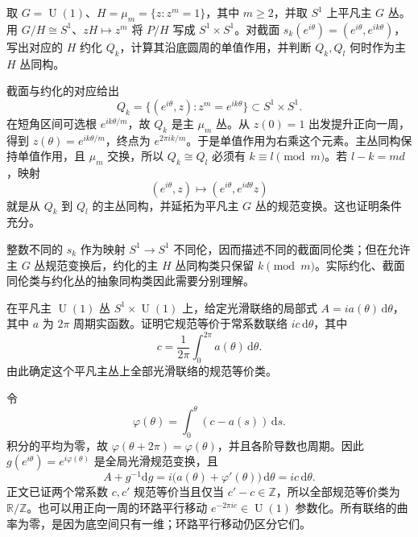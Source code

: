 \begin{exercise}\label{g2:ex:finite-reductions-trivial-circle-bundle}
	取 \(G=\operatorname U(1)\)、\(H=\mu_m=\{z:z^m=1\}\)，其中 \(m\ge2\)，并取 \(S^1\) 上平凡主 \(G\) 丛。用 \(G/H\cong S^1\)、\(zH\mapsto z^m\) 将 \(P/H\) 写成 \(S^1\times S^1\)。对截面 \(s_k(e^{i\theta})=(e^{i\theta},e^{ik\theta})\)，写出对应的 \(H\) 约化 \(Q_k\)，计算其沿底圆周的单值作用，并判断 \(Q_k,Q_l\) 何时作为主 \(H\) 丛同构。
\end{exercise}
\begin{solution}
	截面与约化的对应给出
	\[
		Q_k=\{(e^{i\theta},z):z^m=e^{ik\theta}\}\subset S^1\times S^1.
	\]
	在短角区间可选根 \(e^{ik\theta/m}\)，故 \(Q_k\) 是主 \(\mu_m\) 丛。从 \(z(0)=1\) 出发提升正向一周，得到 \(z(\theta)=e^{ik\theta/m}\)，终点为 \(e^{2\pi ik/m}\)。于是单值作用为右乘这个元素。主丛同构保持单值作用，且 \(\mu_m\) 交换，所以 \(Q_k\cong Q_l\) 必须有 \(k\equiv l\pmod m\)。若 \(l-k=md\)，映射
	\[
		(e^{i\theta},z)\longmapsto(e^{i\theta},e^{id\theta}z)
	\]
	就是从 \(Q_k\) 到 \(Q_l\) 的主丛同构，并延拓为平凡主 \(G\) 丛的规范变换。这也证明条件充分。

	整数不同的 \(s_k\) 作为映射 \(S^1\to S^1\) 不同伦，因而描述不同的截面同伦类；但在允许主 \(G\) 丛规范变换后，约化的主 \(H\) 丛同构类只保留 \(k\pmod m\)。实际约化、截面同伦类与约化丛的抽象同构类因此需要分别理解。
\end{solution}

\begin{exercise}\label{g2:ex:all-circle-unitary-connections}
	在平凡主 \(\operatorname U(1)\) 丛 \(S^1\times\operatorname U(1)\) 上，给定光滑联络的局部式 \(A=i a(\theta)\,\mathrm d\theta\)，其中 \(a\) 为 \(2\pi\) 周期实函数。证明它规范等价于常系数联络 \(i c\,\mathrm d\theta\)，其中
	\[
		c=\frac1{2\pi}\int_0^{2\pi}a(\theta)\,\mathrm d\theta.
	\]
	由此确定这个平凡主丛上全部光滑联络的规范等价类。
\end{exercise}
\begin{solution}
	令
	\[
		\varphi(\theta)=\int_0^\theta(c-a(s))\,\mathrm ds.
	\]
	积分的平均为零，故 \(\varphi(\theta+2\pi)=\varphi(\theta)\)，并且各阶导数也周期。因此 \(g(e^{i\theta})=e^{i\varphi(\theta)}\) 是全局光滑规范变换，且
	\[
		A+g^{-1}\mathrm dg
		=i\bigl(a(\theta)+\varphi'(\theta)\bigr)\,\mathrm d\theta
		=i c\,\mathrm d\theta.
	\]
	正文已证两个常系数 \(c,c'\) 规范等价当且仅当 \(c'-c\in\mathbb Z\)，所以全部规范等价类为 \(\mathbb R/\mathbb Z\)。也可以用正向一周的环路平行移动 \(e^{-2\pi ic}\in\operatorname U(1)\) 参数化。所有联络的曲率为零，是因为底空间只有一维；环路平行移动仍区分它们。
\end{solution}
